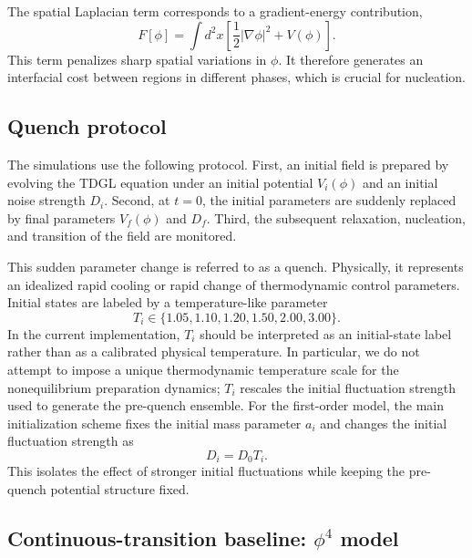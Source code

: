 ﻿\documentclass[aps,pre,preprint,showkeys,amsmath,amssymb,superscriptaddress,longbibliography]{revtex4-2}
\begin{document}
The spatial Laplacian term corresponds to a gradient-energy contribution,
\begin{equation}
F[\phi]=\int d^2x\left[\frac{1}{2}|\nabla\phi|^2+V(\phi)\right].
\end{equation}
This term penalizes sharp spatial variations in $\phi$. It therefore generates an interfacial cost between regions in different phases, which is crucial for nucleation.

\subsection{Quench protocol}\label{quench-protocol}

The simulations use the following protocol. First, an initial field is prepared by evolving the TDGL equation under an initial potential $V_i(\phi)$ and an initial noise strength $D_i$. Second, at $t=0$, the initial parameters are suddenly replaced by final parameters $V_f(\phi)$ and $D_f$. Third, the subsequent relaxation, nucleation, and transition of the field are monitored.

This sudden parameter change is referred to as a quench. Physically, it represents an idealized rapid cooling or rapid change of thermodynamic control parameters. Initial states are labeled by a temperature-like parameter
\begin{equation}
T_i\in\{1.05,1.10,1.20,1.50,2.00,3.00\}.
\end{equation}
In the current implementation, $T_i$ should be interpreted as an initial-state label rather than as a calibrated physical temperature. In particular, we do not attempt to impose a unique thermodynamic temperature scale for the nonequilibrium preparation dynamics; $T_i$ rescales the initial fluctuation strength used to generate the pre-quench ensemble. For the first-order model, the main initialization scheme fixes the initial mass parameter $a_i$ and changes the initial fluctuation strength as
\begin{equation}
D_i=D_0T_i.
\end{equation}
This isolates the effect of stronger initial fluctuations while keeping the pre-quench potential structure fixed.

\subsection{Continuous-transition baseline: \texorpdfstring{$\phi^4$}{phi4} model}\label{continuous-transition-baseline-phi4-model}
\end{document}
